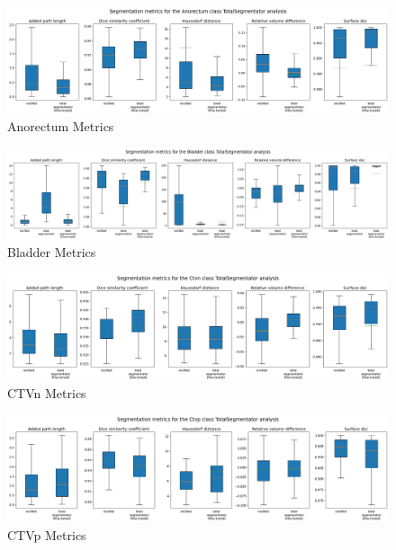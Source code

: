 \documentclass[11pt,twoside]{report}
\begin{document}
\begin{landscape}

  \begin{figure}[H]
    \centering
    \includegraphics[width=\linewidth]{../../research/source/code/data/metrics/metricsanorectum_1_combinednotable_TotalSegmentator_analysis.png}
    \caption{Anorectum Metrics}\label{fig:totalsegmentator-metrics-anorectum}
  \end{figure}

  \begin{figure}[H]
    \centering
    \includegraphics[width=\linewidth]{../../research/source/code/data/metrics/metricsbladder_1_combinednotable_TotalSegmentator_analysis.png}
    \caption{Bladder Metrics}\label{fig:totalsegmentator-metrics-bladder}
  \end{figure}

  \begin{figure}[H]
    \centering
    \includegraphics[width=\linewidth]{../../research/source/code/data/metrics/metricsctvn_1_combinednotable_TotalSegmentator_analysis.png}
    \caption{CTVn Metrics}\label{fig:totalsegmentator-metrics-ctvn}
  \end{figure}

  \begin{figure}[H]
    \centering
    \includegraphics[width=\linewidth]{../../research/source/code/data/metrics/metricsctvp_1_combinednotable_TotalSegmentator_analysis.png}
    \caption{CTVp Metrics}\label{fig:totalsegmentator-metrics-ctvp}
  \end{figure}


\end{landscape}
\end{document}
